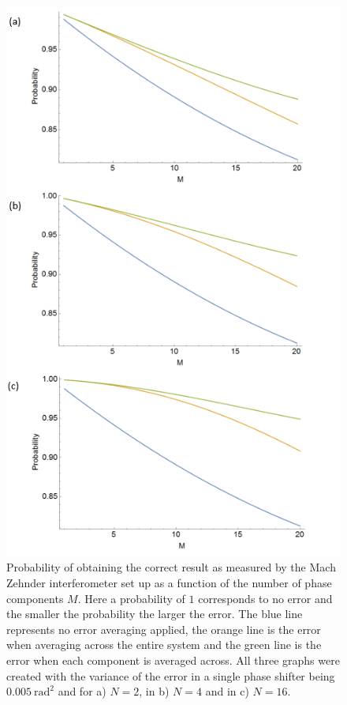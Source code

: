 \documentclass[aps,pra,twocolumn,superscriptaddress,numerical]{revtex4-1}
\begin{document}
		\begin{figure}
			\begin{centering}
				\includegraphics[width=\columnwidth]{Error_all.png}
				\par\end{centering}
			
			\caption[Error as measured by the Mach Zehnder interferometer set up as a function of the number of phase components. ]{Probability of obtaining the correct result as measured by the Mach Zehnder interferometer set up as a function of the number of phase components $M$. Here a probability of $1$ corresponds to no error and the smaller the probability the larger the error. The blue line	represents no error averaging applied, the orange line is the error	when averaging across the entire system and the green line is the error when each component is averaged across. All three graphs were created with the variance of the error in a single phase shifter being $0.005\ \textrm{rad}^{2}$ and for a) $N=2$, in b) $N=4$ and in c) $N=16$. \label{fig:Error-as-measured all}}
		\end{figure}
		
\end{document}
